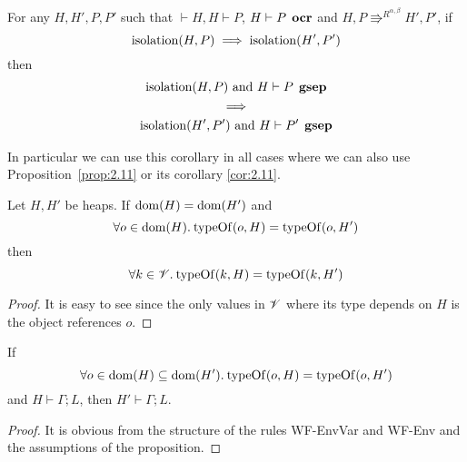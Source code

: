 \begin{corollary} \label{cor:2.9}
  For any $H, H', P, P'$ such that $\vdash H, H \vdash P$, $H \vdash P \:\:
  \mbox{\bf ocr}$ and $H, P \Rrightarrow^{R^{\alpha, \beta}} H', P'$, if
  \begin{equation*}
      \mbox{$\mathrm{isolation}$}(H, P) 
      \implies 
      \mbox{$\mathrm{isolation}$}(H', P')
  \end{equation*}
  then
  \begin{equation*}
    \begin{gathered}
      \mbox{$\mathrm{isolation}$}(H, P) \text{ and } H \vdash P \:\: \mbox{\bf gsep} \\
      \implies \\
      \mbox{$\mathrm{isolation}$}(H', P') \text{ and } H \vdash P' \:\: \mbox{\bf gsep}
    \end{gathered}
  \end{equation*}
\end{corollary}
\begin{remark}
  In particular we can use this corollary in all cases where we can also use
  Proposition~\ref{prop:2.11} or its corollary \ref{cor:2.11}.
\end{remark}

\begin{proposition} \label{prop:2.12}
  Let $H, H'$ be heaps. If $\mbox{$\mathrm{dom}$}{(H)} = \mbox{$\mathrm{dom}$}{(H')}$ and
  \begin{equation*}
    \forall o \in \mbox{$\mathrm{dom}$}{(H)}. \: \mbox{$\mathrm{typeOf}$}{(o, H)} = \mbox{$\mathrm{typeOf}$}{(o, H')}
  \end{equation*}
  then 
  \begin{equation*}
    \forall k \in \mathscr{V}. \: \mbox{$\mathrm{typeOf}$}{(k, H)} = \mbox{$\mathrm{typeOf}$}{(k, H')}
  \end{equation*}
\end{proposition}

\begin{proof}
  It is easy to see since the only values in $\mathscr{V}$ where its type depends on
  $H$ is the object references $o$.
\end{proof}

\begin{proposition} \label{prop:2.19}
  If
  \begin{equation*}
    \forall o \in \mbox{$\mathrm{dom}$}(H) \subseteq \mbox{$\mathrm{dom}$}(H'). \: \mbox{$\mathrm{typeOf}$}(o, H) = \mbox{$\mathrm{typeOf}$}(o, H')
  \end{equation*}
  and $H \vdash \Gamma; L$, then $H' \vdash \Gamma; L$.
\end{proposition}

\begin{proof}
  It is obvious from the structure of the rules {\sc WF-EnvVar} and {\sc
  WF-Env} and the assumptions of the proposition.
\end{proof}

